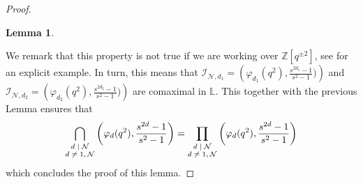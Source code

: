 \documentclass[reqno,a4paper,11pt]{amsart}
\numberwithin{equation}{section}
\numberwithin{figure}{section}
\theoremstyle{definition}
\theoremstyle{plain}
\newtheorem{lem}[defn]{Lemma}
\newcommand{\Z}{\mathbb Z}
\newcommand{\Liq}{\mathbb L}
\newcommand{\cI}{\mathcal{I}}
\newcommand{\cN}{\mathcal{N}}
\begin{document}
\begin{proof}
\begin{lem}
\end{lem}
We remark that this property is not true if we are working over $\Z[q^{\pm2}]$, see \cite{TA}  for an explicit example.
%
 In turn, this means that  $ \cI_{\cN,d_1}=\left(\varphi_{d_1}(q^2), \frac{s^{2d_1}-1}{s^2-1} )\right)$ and  $ \cI_{\cN,d_2}=\left(\varphi_{d_2}(q^2), \frac{s^{2d_2}-1}{s^2-1} )\right)$ are comaximal in $\Liq$. This together with the previous Lemma ensures that
\begin{equation*}
\bigcap_{\text{\scriptsize$\begin{matrix}
 d\mid \cN \\ d \neq 1, \cN \end{matrix}$}}
 \left(\varphi_d(q^2), \frac{s^{2d}-1}{s^2-1}  \right)
=
  \prod_{\text{\scriptsize$\begin{matrix}
 d\mid \cN \\ d \neq 1, \cN \end{matrix}$}}
 \left(\varphi_d(q^2), \frac{s^{2d}-1}{s^2-1} \right)
\end{equation*}
which concludes the proof of this lemma. 
\end{proof}
%
  
\end{document}
